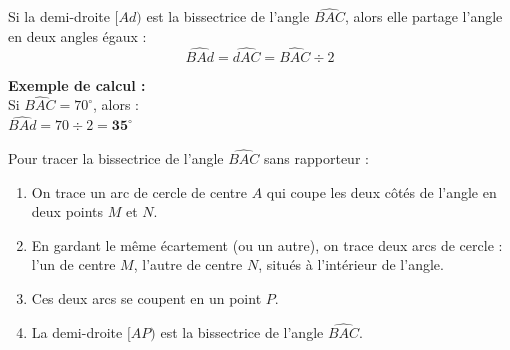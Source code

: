 \documentclass[a4paper]{book}
\begin{document}
    
    \begin{propriete}
        \begin{minipage}[c]{0.55\textwidth}
            Si la demi-droite $[Ad)$ est la bissectrice de l'angle $\widehat{BAC}$, alors elle partage l'angle en deux angles égaux :
            \[ \widehat{BAd} = \widehat{dAC} = \widehat{BAC} \div 2 \]
        
            \textbf{Exemple de calcul :} \\
            Si $\widehat{BAC} = 70^{\circ}$, alors : \\
            $\widehat{BAd} = 70 \div 2 = \mathbf{35^{\circ}}$
        \end{minipage}
        \hfill
        \begin{minipage}[c]{0.4\textwidth}
            \centering
        \end{minipage}
    \end{propriete}
    
    
    \begin{methode}
        Pour tracer la bissectrice de l'angle $\widehat{BAC}$ sans rapporteur :
        \begin{enumerate}
            \item On trace un arc de cercle de centre $A$ qui coupe les deux côtés de l'angle en deux points $M$ et $N$.
            \item En gardant le même écartement (ou un autre), on trace deux arcs de cercle : l'un de centre $M$, l'autre de centre $N$, situés à l'intérieur de l'angle.
            \item Ces deux arcs se coupent en un point $P$. 
            \item La demi-droite $[AP)$ est la bissectrice de l'angle $\widehat{BAC}$.
        \end{enumerate}
    \end{methode}
    
\end{document}
